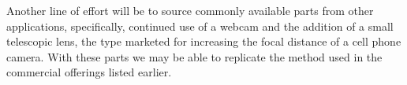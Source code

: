 \documentclass[conference]{IEEEtran}
\begin{document}
Another line of effort will be to source commonly available parts from other applications, specifically, continued use of a webcam and the addition of a small telescopic lens, the type marketed for increasing the focal distance of a cell phone camera.
With these parts we may be able to replicate the method used in the commercial offerings listed earlier.





\end{document}
